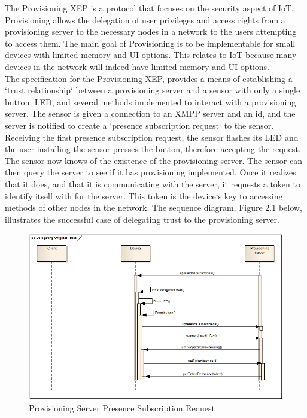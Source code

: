 The Provisioning XEP is a protocol that focuses on the security aspect of IoT. Provisioning allows the delegation of user privileges and access rights from a provisioning server to the necessary nodes in a network to the users attempting to access them. The main goal of Provisioning is to be implementable for small devices with limited memory and UI options. This relates to IoT because many devices in the network will indeed have limited memory and UI options. \\
The specification for the Provisioning XEP, provides a means of establishing a `trust relationship` between a provisioning server and a sensor with only a single button, LED, and several methods implemented to interact with a provisioning server. The sensor is given a connection to an XMPP server and an id, and the server is notified to create a `presence subscription request` to the sensor. Receiving the first presence subscription request, the sensor flashes its LED and the user installing the sensor presses the button, therefore accepting the request. The sensor now knows of the existence of the provisioning server. The sensor can then query the server to see if it has provisioning implemented. Once it realizes that it does, and that it is communicating with the server, it requests a token to identify itself with for the server. This token is the device`s key to accessing methods of other nodes in the network. The sequence diagram, Figure 2.1 below, illustrates the successful case of delegating trust to the provisioning server. \\
\begin{figure}
\caption{Provisioning Server Presence Subscription Request}
\includegraphics[scale=.25]{images/delegatingTrustSimpleNode}
\end{figure}
